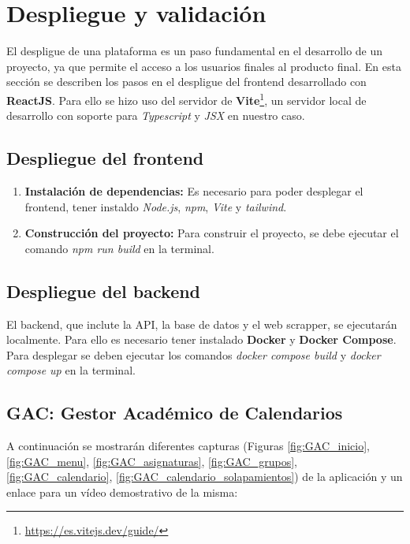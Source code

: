 \chapter{Despliegue y validación}

El despligue de una plataforma es un paso fundamental en el desarrollo de un proyecto, ya que permite el acceso a los usuarios finales al producto final. En esta sección se describen los pasos en el despligue del frontend desarrollado con \textbf{ReactJS}. Para ello se hizo uso del servidor de \textbf{Vite}\footnote{\url{https://es.vitejs.dev/guide/}}, un servidor local de desarrollo con soporte para \textit{Typescript} y \textit{JSX} en nuestro caso.

\section{Despliegue del frontend}

\begin{enumerate}
    \item \textbf{Instalación de dependencias:} Es necesario para poder desplegar el frontend, tener instaldo \textit{Node.js}, \textit{npm}, \textit{Vite} y \textit{tailwind}.
    \item \textbf{Construcción del proyecto:} Para construir el proyecto, se debe ejecutar el comando \textit{npm run build} en la terminal.
\end{enumerate}

\section{Despliegue del backend}

El backend, que inclute la API, la base de datos y el web scrapper, se ejecutarán localmente. Para ello es necesario tener instalado \textbf{Docker} y \textbf{Docker Compose}. Para desplegar se deben ejecutar los comandos \textit{docker compose build} y \textit{docker compose up} en la terminal.

\section{GAC: Gestor Académico de Calendarios}

A continuación se mostrarán diferentes capturas (Figuras \ref{fig:GAC_inicio}, \ref{fig:GAC_menu}, \ref{fig:GAC_asignaturas}, \ref{fig:GAC_grupos}, \ref{fig:GAC_calendario}, \ref{fig:GAC_calendario_solapamientos}) de la aplicación y un enlace para un vídeo demostrativo de la misma:

